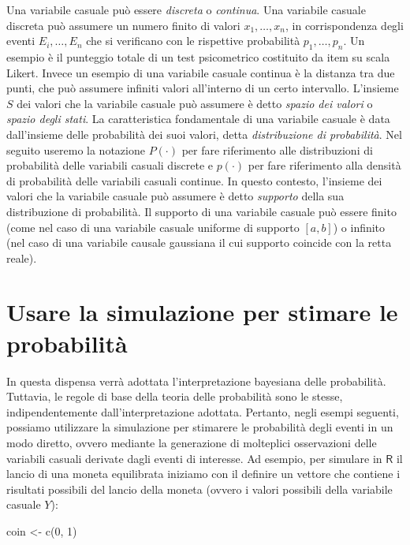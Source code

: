 \documentclass[
  11pt,
]{krantz}
\makeatletter
\newenvironment{Shaded}{\begin{snugshade}}{\end{snugshade}}
\newcommand{\DecValTok}[1]{\textcolor[rgb]{0.06,0.06,0.06}{#1}}
\newcommand{\FunctionTok}[1]{\textcolor[rgb]{0,0,0}{#1}}
\newcommand{\NormalTok}[1]{#1}
\newcommand{\OtherTok}[1]{\textcolor[rgb]{0.37,0.37,0.37}{#1}}
\newenvironment{kframe}{%
\medskip{}
\setlength{\fboxsep}{.8em}
 \def\at@end@of@kframe{}%
 \ifinner\ifhmode%
  \def\at@end@of@kframe{\end{minipage}}%
  \begin{minipage}{\columnwidth}%
 \fi\fi%
 \def\FrameCommand##1{\hskip\@totalleftmargin \hskip-\fboxsep
 \colorbox{shadecolor}{##1}\hskip-\fboxsep
     \hskip-\linewidth \hskip-\@totalleftmargin \hskip\columnwidth}%
 \MakeFramed {\advance\hsize-\width
   \@totalleftmargin\z@ \linewidth\hsize
   \@setminipage}}%
 {\par\unskip\endMakeFramed%
 \at@end@of@kframe}
\renewenvironment{Shaded}{\begin{kframe}}{\end{kframe}}
\newcommand{\R}{\textsf{R}} %
\theoremstyle{definition}
\theoremstyle{definition}
\theoremstyle{definition}
\theoremstyle{definition}
\theoremstyle{remark}
\makeatother
\begin{document}
Una variabile casuale può essere \emph{discreta} o \emph{continua}. Una variabile casuale discreta può assumere un numero finito di valori \(x_1, \dots ,x_n\), in corrispondenza degli eventi \(E_i, \dots, E_n\) che si verificano con le rispettive probabilità \(p_1, \dots, p_n\). Un esempio è il punteggio totale di un test psicometrico costituito da item su scala Likert. Invece un esempio di una variabile casuale continua è la distanza tra due punti, che può assumere infiniti valori all'interno di un certo intervallo. L'insieme \(S\) dei valori che la variabile casuale può assumere è detto \emph{spazio dei valori} o \emph{spazio degli stati}. La caratteristica fondamentale di una variabile casuale è data dall'insieme delle probabilità dei suoi valori, detta \emph{distribuzione di probabilità}. Nel seguito useremo la notazione \(P(\cdot)\) per fare riferimento alle distribuzioni di probabilità delle variabili casuali discrete e \(p(\cdot)\) per fare riferimento alla densità di probabilità delle variabili casuali continue. In questo contesto, l'insieme dei valori che la variabile casuale può assumere è detto \emph{supporto} della sua distribuzione di probabilità. Il supporto di una variabile casuale può essere finito (come nel caso di una variabile casuale uniforme di supporto \([a, b]\)) o infinito (nel caso di una variabile causale gaussiana il cui supporto coincide con la retta reale).

\hypertarget{usare-la-simulazione-per-stimare-le-probabilituxe0}{%
\section{Usare la simulazione per stimare le probabilità}\label{usare-la-simulazione-per-stimare-le-probabilituxe0}}

In questa dispensa verrà adottata l'interpretazione bayesiana delle probabilità. Tuttavia, le regole di base della teoria delle probabilità sono le stesse, indipendentemente dall'interpretazione adottata. Pertanto, negli esempi seguenti, possiamo utilizzare la simulazione per stimarere le probabilità degli eventi in un modo diretto, ovvero mediante la generazione di molteplici osservazioni delle variabili casuali derivate dagli eventi di interesse. Ad esempio, per simulare in \(\R\) il lancio di una moneta equilibrata iniziamo con il definire un vettore che contiene i risultati possibili del lancio della moneta (ovvero i valori possibili della variabile casuale \(Y\)):

\begin{Shaded}
\begin{Highlighting}[]
\NormalTok{coin }\OtherTok{\textless{}{-}} \FunctionTok{c}\NormalTok{(}\DecValTok{0}\NormalTok{, }\DecValTok{1}\NormalTok{)}
\end{Highlighting}
\end{Shaded}
\end{document}
